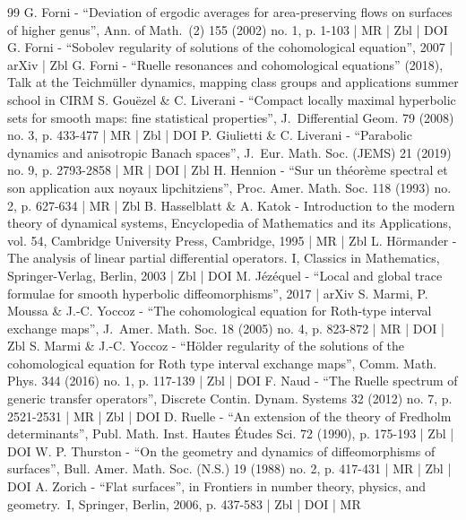 \begin{thebibliography}{99}
G. Forni - “Deviation of ergodic averages for area-preserving flows on surfaces of higher genus”, Ann. of Math. (2) 155 (2002) no. 1, p. 1-103 | MR | Zbl | DOI
G. Forni - “Sobolev regularity of solutions of the cohomological equation”, 2007 | arXiv | Zbl
G. Forni - “Ruelle resonances and cohomological equations” (2018), Talk at the Teichmüller dynamics, mapping class groups and applications summer school in CIRM
S. Gouëzel \& C. Liverani - “Compact locally maximal hyperbolic sets for smooth maps: fine statistical properties”, J. Differential Geom. 79 (2008) no. 3, p. 433-477 | MR | Zbl | DOI
P. Giulietti \& C. Liverani - “Parabolic dynamics and anisotropic Banach spaces”, J. Eur. Math. Soc. (JEMS) 21 (2019) no. 9, p. 2793-2858 | MR | DOI | Zbl
H. Hennion - “Sur un théorème spectral et son application aux noyaux lipchitziens”, Proc. Amer. Math. Soc. 118 (1993) no. 2, p. 627-634 | MR | Zbl
B. Hasselblatt \& A. Katok - Introduction to the modern theory of dynamical systems, Encyclopedia of Mathematics and its Applications, vol. 54, Cambridge University Press, Cambridge, 1995 | MR | Zbl
L. Hörmander - The analysis of linear partial differential operators. I, Classics in Mathematics, Springer-Verlag, Berlin, 2003 | Zbl | DOI
M. Jézéquel - “Local and global trace formulae for smooth hyperbolic diffeomorphisms”, 2017 | arXiv
S. Marmi, P. Moussa \& J.-C. Yoccoz - “The cohomological equation for Roth-type interval exchange maps”, J. Amer. Math. Soc. 18 (2005) no. 4, p. 823-872 | MR | DOI | Zbl
S. Marmi \& J.-C. Yoccoz - “Hölder regularity of the solutions of the cohomological equation for Roth type interval exchange maps”, Comm. Math. Phys. 344 (2016) no. 1, p. 117-139 | Zbl | DOI
F. Naud - “The Ruelle spectrum of generic transfer operators”, Discrete Contin. Dynam. Systems 32 (2012) no. 7, p. 2521-2531 | MR | Zbl | DOI
D. Ruelle - “An extension of the theory of Fredholm determinants”, Publ. Math. Inst. Hautes Études Sci. 72 (1990), p. 175-193 | Zbl | DOI
W. P. Thurston - “On the geometry and dynamics of diffeomorphisms of surfaces”, Bull. Amer. Math. Soc. (N.S.) 19 (1988) no. 2, p. 417-431 | MR | Zbl | DOI
A. Zorich - “Flat surfaces”, in Frontiers in number theory, physics, and geometry. I, Springer, Berlin, 2006, p. 437-583 | Zbl | DOI | MR
\end{thebibliography}
